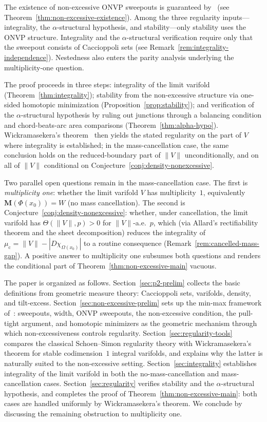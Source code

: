\begin{remark}\label{rem:existence-vs-regularity}
The existence of non-excessive ONVP sweepouts is guaranteed by~\cite[Theorem~2.2]{CLS22} (see Theorem~\ref{thm:non-excessive-existence}). Among the three regularity inputs---integrality, the $\alpha$-structural hypothesis, and stability---only stability uses the ONVP structure. Integrality and the $\alpha$-structural verification require only that the sweepout consists of Caccioppoli sets (see Remark~\ref{rem:integrality-independence}). Nestedness also enters the parity analysis underlying the multiplicity-one question.
\end{remark}

The proof proceeds in three steps: integrality of the limit varifold (Theorem~\ref{thm:integrality}); stability from the non-excessive structure via one-sided homotopic minimization (Proposition~\ref{prop:stability}); and verification of the $\alpha$-structural hypothesis by ruling out junctions through a balancing condition and chord-beats-arc area comparisons (Theorem~\ref{thm:alpha-hypo}). Wickramasekera's theorem~\cite{Wic14} then yields the stated regularity on the part of $V$ where integrality is established; in the mass-cancellation case, the same conclusion holds on the reduced-boundary part of $\|V\|$ unconditionally, and on all of $\|V\|$ conditional on Conjecture~\ref{conj:density-nonexcessive}.

Two parallel open questions remain in the mass-cancellation case. The first is \emph{multiplicity one}: whether the limit varifold $V$ has multiplicity~$1$, equivalently $\mathbf{M}(\Phi(x_0)) = W$ (no mass cancellation). The second is Conjecture~\ref{conj:density-nonexcessive}: whether, under cancellation, the limit varifold has $\Theta(\|V\|, p) > 0$ for $\|V\|$-a.e.\ $p$, which (via Allard's rectifiability theorem and the sheet decomposition) reduces the integrality of $\mu_{\mathrm{c}} = \|V\| - |D\chi_{\Omega(x_0)}|$ to a routine consequence (Remark~\ref{rem:cancelled-mass-gap}). A positive answer to multiplicity one subsumes both questions and renders the conditional part of Theorem~\ref{thm:non-excessive-main} vacuous.

The paper is organized as follows. Section~\ref{sec:p2-prelim} collects the basic definitions from geometric measure theory: Caccioppoli sets, varifolds, density, and tilt-excess. Section~\ref{sec:non-excessive-prelim} sets up the min-max framework of~\cite{CLS22}: sweepouts, width, ONVP sweepouts, the non-excessive condition, the pull-tight argument, and homotopic minimizers as the geometric mechanism through which non-excessiveness controls regularity. Section~\ref{sec:regularity-tools} compares the classical Schoen--Simon regularity theory with Wickramasekera's theorem for stable codimension~$1$ integral varifolds, and explains why the latter is naturally suited to the non-excessive setting. Section~\ref{sec:integrality} establishes integrality of the limit varifold in both the no-mass-cancellation and mass-cancellation cases. Section~\ref{sec:regularity} verifies stability and the $\alpha$-structural hypothesis, and completes the proof of Theorem~\ref{thm:non-excessive-main}: both cases are handled uniformly by Wickramasekera's theorem. We conclude by discussing the remaining obstruction to multiplicity one.
